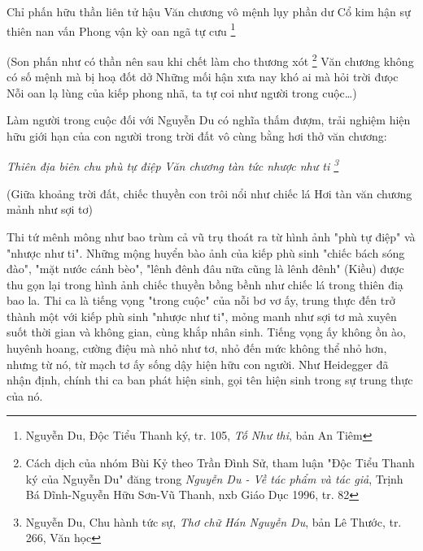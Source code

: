 \documentclass[../main.tex]{subfiles}
\begin{document}
\begin{multicols}{2}
\begin{blockquote}
Chỉ phấn hữu thần liên tử hậu        
Văn chương vô mệnh lụy phần dư        
Cổ kim hận sự thiên nan vấn        
Phong vận kỳ oan ngã tự cưu \footnote{
Nguyễn Du, Độc Tiểu Thanh ký, tr. 105, \textit{Tố Như thi}, bản An Tiêm}  
        
(Son phấn như có thần nên sau khi chết làm cho thương xót \footnote{
Cách dịch của nhóm Bùi Kỷ theo Trần Đình Sử, tham luận "Độc Tiểu Thanh ký của Nguyễn Du" đăng trong \textit{Nguyễn Du - Về tác phẩm và tác giả}, Trịnh Bá Dĩnh-Nguyễn Hữu Sơn-Vũ Thanh, nxb Giáo Dục 1996, tr. 82}         
Văn chương không có số mệnh mà bị hoạ đốt dở        
Những mối hận xưa nay khó ai mà hỏi trời đưọc        
Nỗi oan lạ lùng của kiếp phong nhã, ta tự coi như người trong cuộc…) 

\end{blockquote}
 
Làm người trong cuộc đối với Nguyễn Du có nghĩa thấm đượm, trải nghiệm hiện hữu giới hạn của con người trong trời đất vô cùng bằng hơi thở văn chương: 
\begin{blockquote}
        
\textit{Thiên địa biên chu phù tự điệp}        
\textit{Văn chương tàn tức nhược như ti \footnote{
Nguyễn Du, Chu hành tức sự, \textit{Thơ chữ Hán Nguyễn Du}, bản Lê Thước, tr. 266, Văn học} } 
        
(Giữa khoảng trời đất, chiếc thuyền con trôi nổi như chiếc lá        
Hơi tàn văn chương mảnh như sợi tơ) 

\end{blockquote}
 
Thi tứ mênh mông như bao trùm cả vũ trụ thoát ra từ hình ảnh "phù tự điệp" và "nhược như ti". Những mộng huyển bào ảnh của kiếp phù sinh "chiếc bách sóng đào", "mặt nước cánh bèo", "lênh đênh đâu nữa cũng là lênh đênh" (Kiều) được thu gọn lại trong hình ảnh chiếc thuyền bồng bềnh như chiếc lá trong thiên điạ bao la. Thi ca là tiếng vọng "trong cuộc" của nỗi bơ vơ ấy, trung thực đến trở thành một với kiếp phù sinh "nhược như ti", mỏng manh như sợi tơ mà xuyên suốt thời gian và không gian, cùng khắp nhân sinh. Tiếng vọng ấy không ồn ào, huyênh hoang, cường điệu mà nhỏ như tơ, nhỏ đến mức không thể nhỏ hơn, nhưng từ nó, từ mạch tơ ấy sống dậy hiện hữu con người. Như Heidegger đã nhận định, chính thi ca ban phát hiện sinh, gọi tên hiện sinh trong sự trung thực của nó. 
 

\end{multicols}
\end{document}
